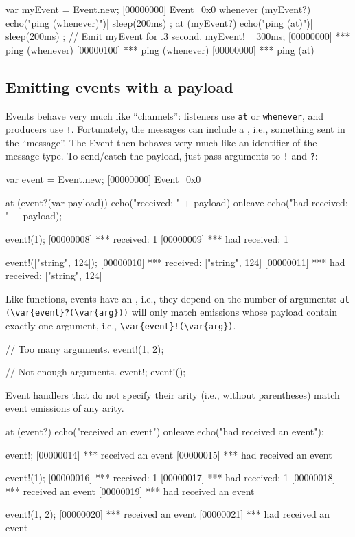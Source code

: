 \begin{urbiunchecked}[firstnumber=1]
var myEvent = Event.new;
[00000000] Event_0x0
whenever (myEvent?)
{
  echo("ping (whenever)")|
  sleep(200ms)
};
at (myEvent?)
{
  echo("ping (at)")|
  sleep(200ms)
};
// Emit myEvent for .3 second.
myEvent! ~ 300ms;
[00000000] *** ping (whenever)
[00000100] *** ping (whenever)
[00000000] *** ping (at)
\end{urbiunchecked}

\subsection{Emitting events with a payload}
\label{sec:tut:events:payload}

Events behave very much like ``channels'': listeners use \lstinline|at| or
\lstinline|whenever|, and producers use \lstinline|!|.  Fortunately, the
messages can include a , i.e., something sent in the
``message''.  The Event then behaves very much like an identifier of the
message type.  To send/catch the payload, just pass arguments to
\lstinline|!| and \lstinline|?|:

\begin{urbiscript}
var event = Event.new;
[00000000] Event_0x0

at (event?(var payload))
  echo("received: " + payload)
onleave
  echo("had received: " + payload);

event!(1);
[00000008] *** received: 1
[00000009] *** had received: 1

event!(["string", 124]);
[00000010] *** received: ["string", 124]
[00000011] *** had received: ["string", 124]
\end{urbiscript}

Like functions, events have an , i.e., they depend on the number
of arguments: \lstinline|at (\var{event}?(\var{arg}))| will only match
emissions whose payload contain exactly one argument, i.e.,
\lstinline|\var{event}!(\var{arg})|.

\begin{urbiscript}
// Too many arguments.
event!(1, 2);

// Not enough arguments.
event!;
event!();
\end{urbiscript}

Event handlers that do not specify their arity (i.e., without parentheses)
match event emissions of any arity.

\begin{urbiscript}
at (event?)
  echo("received an event")
onleave
  echo("had received an event");

event!;
[00000014] *** received an event
[00000015] *** had received an event

event!(1);
[00000016] *** received: 1
[00000017] *** had received: 1
[00000018] *** received an event
[00000019] *** had received an event

event!(1, 2);
[00000020] *** received an event
[00000021] *** had received an event
\end{urbiscript}

